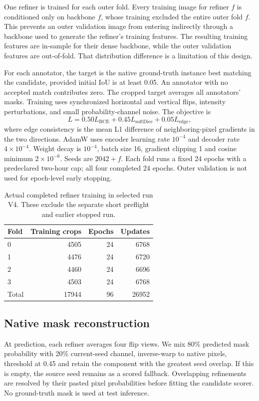 \documentclass[sigconf]{acmart}
\begin{document}
One refiner is trained for each outer fold. Every training image for refiner $f$ is conditioned only on backbone $f$, whose training excluded the entire outer fold $f$. This prevents an outer validation image from entering indirectly through a backbone used to generate the refiner's training features. The resulting training features are in-sample for their dense backbone, while the outer validation features are out-of-fold. That distribution difference is a limitation of this design.

For each annotator, the target is the native ground-truth instance best matching the candidate, provided initial IoU is at least 0.05. An annotator with no accepted match contributes zero. The cropped target averages all annotators' masks. Training uses synchronized horizontal and vertical flips, intensity perturbations, and small probability-channel noise. The objective is
\begin{equation}
L=0.50 L_{\mathrm{BCE}}+0.45 L_{\mathrm{softDice}}+0.05 L_{\mathrm{edge}},
\end{equation}
where edge consistency is the mean L1 difference of neighboring-pixel gradients in the two directions. AdamW uses encoder learning rate $10^{-4}$ and decoder rate $4\times10^{-4}$. Weight decay is $10^{-4}$, batch size 16, gradient clipping 1 and cosine minimum $2\times10^{-6}$. Seeds are $2042+f$. Each fold runs a fixed 24 epochs with a predeclared two-hour cap; all four completed 24 epochs. Outer validation is not used for epoch-level early stopping.

\begin{table}[h]
\caption{Actual completed refiner training in selected run V4. These exclude the separate short preflight and earlier stopped run.}
\centering\small
\begin{tabular}{lrrr}\toprule
Fold & Training crops & Epochs & Updates\\\midrule
0 & 4505 & 24 & 6768\\
1 & 4476 & 24 & 6720\\
2 & 4460 & 24 & 6696\\
3 & 4503 & 24 & 6768\\\midrule
Total & 17944 & 96 & 26952\\\bottomrule
\end{tabular}
\end{table}

\subsection{Native mask reconstruction}
At prediction, each refiner averages four flip views. We mix 80\% predicted mask probability with 20\% current-seed channel, inverse-warp to native pixels, threshold at 0.45 and retain the component with the greatest seed overlap. If this is empty, the source seed remains as a scored fallback. Overlapping refinements are resolved by their pasted pixel probabilities before fitting the candidate scorer. No ground-truth mask is used at test inference.
\end{document}
